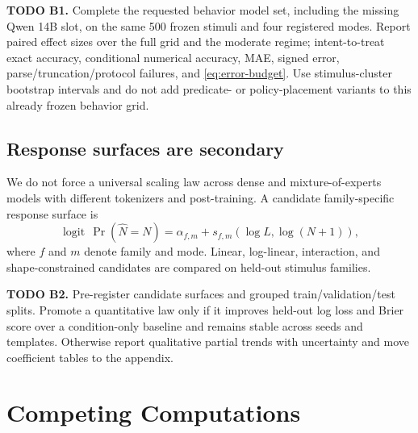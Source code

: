 \documentclass[10pt,twocolumn]{article}
\newcommand{\todoid}[2]{%
  \par\noindent\textcolor{red!75!black}{\textbf{TODO #1.} #2}\par}
\newcommand{\logit}{\operatorname{logit}}
\begin{document}
\todoid{B1}{Complete the requested behavior model set, including the missing Qwen 14B slot,
on the same 500 frozen stimuli and four registered modes. Report paired effect sizes over the
full grid and the moderate regime; intent-to-treat exact accuracy, conditional numerical
accuracy, MAE, signed error, parse/truncation/protocol failures, and
\cref{eq:error-budget}. Use stimulus-cluster bootstrap intervals and do not add predicate- or
policy-placement variants to this already frozen behavior grid.}

\subsection{Response surfaces are secondary}
We do not force a universal scaling law across dense and mixture-of-experts models with
different tokenizers and post-training. A candidate family-specific response surface is
\[
 \logit\,\Pr(\widehat N=N)
 =\alpha_{f,m}+s_{f,m}\!\left(\log L,\log(N+1)\right),
\]
where $f$ and $m$ denote family and mode. Linear, log-linear, interaction, and
shape-constrained candidates are compared on held-out stimulus families.

\todoid{B2}{Pre-register candidate surfaces and grouped train/validation/test splits. Promote
a quantitative law only if it improves held-out log loss and Brier score over a
condition-only baseline and remains stable across seeds and templates. Otherwise report
qualitative partial trends with uncertainty and move coefficient tables to the appendix.}

\section{Competing Computations}
\end{document}
